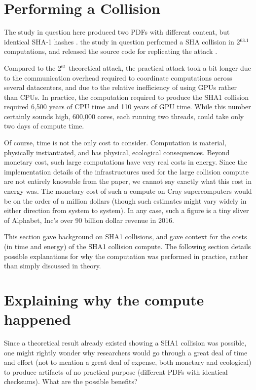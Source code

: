 \documentclass[sigconf]{acmart}
\begin{document}
\section{Performing a Collision}
\label{sec:org790d7f5}

The study in question here produced two PDFs with different content, but identical SHA-1 hashes
\cite{Stevens2017}.
the study in question performed a SHA collision in 2\(^{\text{63.1}}\) computations, 
and released the source code for replicating the attack
\cite{Stevens2017github}.

Compared to the 2\(^{\text{61}}\) theoretical attack, the practical attack took a bit longer due to the communication overhead required to coordinate computations across several datacenters, and due to the relative inefficiency of using GPUs rather than CPUs.
In practice, the computation required to produce the SHA1 collision required 6,500 years of CPU time and 110 years of GPU time. While this number certainly sounds high, 600,000 cores, each running two threads, could take only two days of compute time.

Of course, time is not the only cost to consider.
Computation is material, physically instiantiated, and has physical, ecological consequences.
Beyond monetary cost, such large computations have very real costs in energy.
Since the implementation details of the infrastructures used for the large collision compute are not entirely knowable from the paper,
we cannot say exactly what this cost in energy was.
The monetary cost of such a compute on Cray supercomputers would be on the order of a million dollars
\cite{Pautsch2016}
(though such estimates might vary widely in either direction from system to system).
In any case, such a figure is a tiny sliver of Alphabet, Inc's over 90 billion dollar revenue in 2016.

This section gave background on SHA1 collisions, 
and gave context for the costs (in time and energy) of the SHA1 collision compute.
The following section details possible explanations for why the computation was performed
in practice, rather than simply discussed in theory.


\section{Explaining why the compute happened}
\label{sec:org607515b}

Since a theoretical result already existed showing a SHA1 collision was possible, 
one might rightly wonder why researchers would go through a great deal of time and effort
(not to mention a great deal of expense, both monetary and ecological)
to produce artifacts of no practical purpose (different PDFs with identical checksums).
What are the possible benefits?
\end{document}
